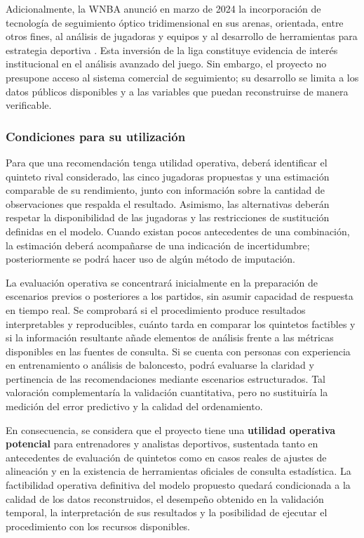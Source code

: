 Adicionalmente, la WNBA anunció en marzo de 2024 la incorporación de tecnología de seguimiento óptico tridimensional en sus arenas, orientada, entre otros fines, al análisis de jugadoras y equipos y al desarrollo de herramientas para estrategia deportiva \cite{wnba2024tracking}. Esta inversión de la liga constituye evidencia de interés institucional en el análisis avanzado del juego. Sin embargo, el proyecto no presupone acceso al sistema comercial de seguimiento; su desarrollo se limita a los datos públicos disponibles y a las variables que puedan reconstruirse de manera verificable.

\subsubsection*{Condiciones para su utilización}

Para que una recomendación tenga utilidad operativa, deberá identificar el quinteto rival considerado, las cinco jugadoras propuestas y una estimación comparable de su rendimiento, junto con información sobre la cantidad de observaciones que respalda el resultado. Asimismo, las alternativas deberán respetar la disponibilidad de las jugadoras y las restricciones de sustitución definidas en el modelo. Cuando existan pocos antecedentes de una combinación, la estimación deberá acompañarse de una indicación de incertidumbre; posteriormente se podrá hacer uso de algún método de imputación. 

La evaluación operativa se concentrará inicialmente en la preparación de escenarios previos o posteriores a los partidos, sin asumir capacidad de respuesta en tiempo real. Se comprobará si el procedimiento produce resultados interpretables y reproducibles, cuánto tarda en comparar los quintetos factibles y si la información resultante añade elementos de análisis frente a las métricas disponibles en las fuentes de consulta. Si se cuenta con personas con experiencia en entrenamiento o análisis de baloncesto, podrá evaluarse la claridad y pertinencia de las recomendaciones mediante escenarios estructurados. Tal valoración complementaría la validación cuantitativa, pero no sustituiría la medición del error predictivo y la calidad del ordenamiento.

En consecuencia, se considera que el proyecto tiene una \textbf{utilidad operativa potencial} para entrenadores y analistas deportivos, sustentada tanto en antecedentes de evaluación de quintetos como en casos reales de ajustes de alineación y en la existencia de herramientas oficiales de consulta estadística. La factibilidad operativa definitiva del modelo propuesto quedará condicionada a la calidad de los datos reconstruidos, el desempeño obtenido en la validación temporal, la interpretación de sus resultados y la posibilidad de ejecutar el procedimiento con los recursos disponibles.